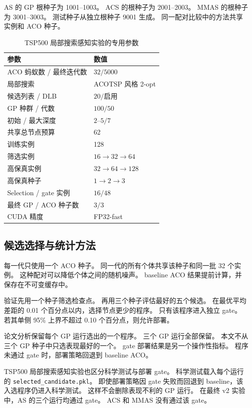 \documentclass[letterpaper,journal]{IEEEtran}
\begin{document}
AS 的 GP 根种子为 1001--1003。
ACS 的根种子为 2001--2003。
MMAS 的根种子为 3001--3003。
测试种子从独立根种子 9001 生成。
同一配对比较中的方法共享实例和 ACO 种子。

\begin{table}[t]
\caption{TSP500 局部搜索感知实验的专用参数}
\label{tab:ls-parameters-zh}
\centering
\footnotesize
\begin{tabular}{ll}
\toprule
参数 & 数值\\
\midrule
ACO 蚂蚁数 / 最终迭代数 & \(32/5000\)\\
局部搜索 & ACOTSP 风格 2-opt\\
候选列表 / DLB & \(20/\)启用\\
GP 种群 / 代数 & \(100/50\)\\
初始 / 最大深度 & \(2\)--\(5/7\)\\
共享总节点预算 & 62\\
训练实例 & 128\\
筛选实例 & \(16\to32\to64\)\\
高保真实例 & \(32\to64\to128\)\\
高保真种子 & \(1\to2\to3\)\\
Selection / gate 实例 & \(16/48\)\\
最终 GP / ACO 种子数 & \(3/3\)\\
CUDA 精度 & FP32-fast\\
\bottomrule
\end{tabular}
\end{table}

\subsection{候选选择与统计方法}

每一代只使用一个 ACO 种子。
同一代的所有个体共享该种子和同一批 32 个实例。
这种配对可以降低个体之间的随机噪声。
baseline ACO 结果提前计算，并保存在不可变缓存中。

验证先用一个种子筛选检查点。
再用三个种子评估最好的五个候选。
在最优平均差距的 0.01 个百分点以内，选择节点更少的程序。
只有该程序进入独立 gate。
若其单侧 95\% 上界不超过 0.10 个百分点，则允许部署。

论文分析保留每个 GP 运行选出的一个程序。
三个 GP 运行全部保留。
本文不从三个 GP 种子中只选表现最好的一个。
gate 部署结果是另一个操作性指标。
程序未通过 gate 时，部署策略回退到 baseline ACO。

TSP500 局部搜索感知实验也区分科学测试与部署 gate。
科学测试载入每个运行的 \texttt{selected\_candidate.pkl}。
即使部署策略因 gate 失败而回退到 baseline，该入选程序仍进入科学测试。
这样不会删除表现不利的 GP 运行。
在最终 v2 实验中，AS 的三个运行均通过 gate。
ACS 和 MMAS 没有通过该 gate。
\end{document}
